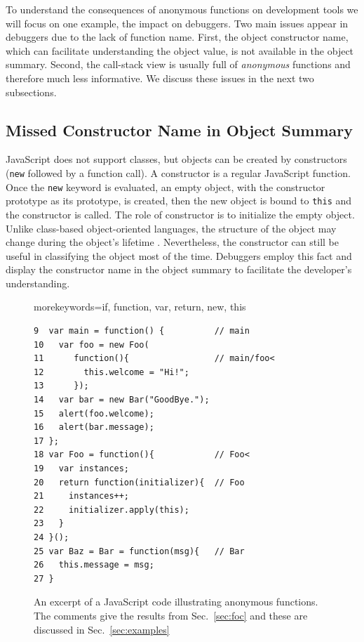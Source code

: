 \documentclass[10pt, preprint]{sigplanconf}
\begin{document}
To understand the consequences of anonymous functions on development tools we will focus on one example, the impact on debuggers.
Two main issues appear in debuggers due to the lack of function name. First, the object constructor name, which can facilitate understanding the object value, is not available in the object summary. Second, the call-stack view is usually full of \textit{anonymous} functions and therefore much less informative. We discuss these issues in the next two subsections. 
 
\subsection{Missed Constructor Name in Object Summary}
\label{sec:missedctor}
JavaScript does not support classes, but objects can be created by constructors (\verb|new| followed by a function call). A constructor is a regular JavaScript function. Once the \verb|new| keyword is evaluated, an empty object, with the constructor prototype as its prototype, is created, then the new object is bound to \verb|this| and the constructor is called. The role of constructor is to initialize the empty object. Unlike class-based object-oriented languages, the structure of the object  may change during the object's lifetime \cite{Richards2}. Nevertheless, the constructor can still be useful in classifying the object most of the time.
Debuggers employ this fact and display the constructor name in the object summary to facilitate the developer's understanding. 

\begin{figure}%

\lstset{basicstyle=\scriptsize}
{morekeywords={if, function, var, return, new, this}}

\begin{lstlisting}[frame=single, language=myLang]
9  var main = function() {          // main
10   var foo = new Foo(            
11      function(){                 // main/foo<
12        this.welcome = "Hi!";
13      });
14   var bar = new Bar("GoodBye.");
15   alert(foo.welcome);
16   alert(bar.message);
17 };
18 var Foo = function(){            // Foo<    
19   var instances;
20   return function(initializer){  // Foo
21     instances++;         
22     initializer.apply(this);
23   }
24 }();
25 var Baz = Bar = function(msg){   // Bar
26   this.message = msg;
27 }
\end{lstlisting}
\caption{An excerpt of a JavaScript code illustrating anonymous functions. The comments give the results from Sec.~\ref{sec:foc} and these are discussed in Sec.~\ref{sec:examples}}
\label{js-code}
\end{figure}
\end{document}
